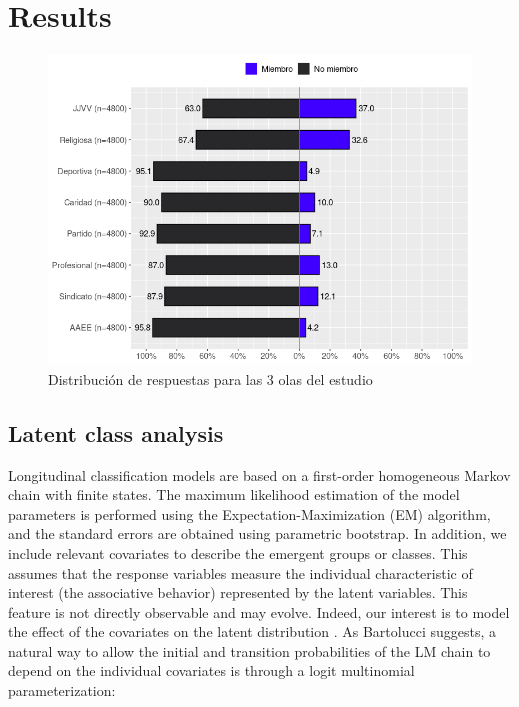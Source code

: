 \section{Results}


\begin{figure}[H]
    \centering
    \includegraphics[width=13cm]{output/plot_items.png}
    \caption{Distribución de respuestas para las 3 olas del estudio}
    \label{fig:likert}
\end{figure}



\subsection{Latent class analysis}

Longitudinal classification models are based on a first-order homogeneous Markov chain with finite states. The maximum likelihood estimation of the model parameters is performed using the Expectation-Maximization (EM) algorithm, and the standard errors are obtained using parametric bootstrap. In addition, we include relevant covariates to describe the emergent groups or classes. This assumes that the response variables measure the individual characteristic of interest (the associative behavior) represented by the latent variables. This feature is not directly observable and may evolve. Indeed, our interest is to model the effect of the covariates on the latent distribution \parencite{bartolucci_latent_2009}. As Bartolucci \citeyear{bartolucci_latent_2015} suggests, a natural way to allow the initial and transition probabilities of the LM chain to depend on the individual covariates is through a logit multinomial parameterization:

